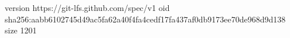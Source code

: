 version https://git-lfs.github.com/spec/v1
oid sha256:aabb6102745d49ac5fa62a40f4fa4cedf17fa437af0db9173ee70de968d9d138
size 1201
